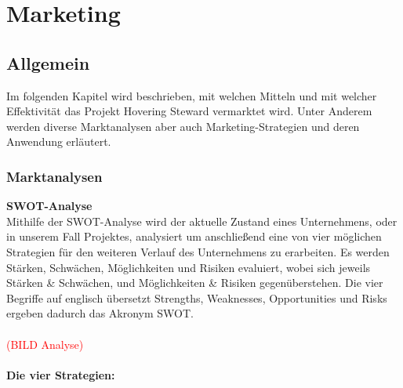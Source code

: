 \chapter{Marketing}
\renewcommand{\kapitelautor}{Autor: Markus Kaiser}

\section{Allgemein}
Im folgenden Kapitel wird beschrieben, mit welchen Mitteln und mit welcher Effektivität
das Projekt Hovering Steward vermarktet wird. Unter Anderem werden diverse Marktanalysen
aber auch Marketing-Strategien und deren Anwendung erläutert.

  \subsection{Marktanalysen}
  \textbf{SWOT-Analyse}\\
  Mithilfe der SWOT-Analyse wird der aktuelle Zustand eines Unternehmens, oder in unserem Fall Projektes, analysiert um anschließend eine von vier möglichen Strategien
  für den weiteren Verlauf des Unternehmens zu erarbeiten. Es werden Stärken, Schwächen, Möglichkeiten und Risiken evaluiert, wobei sich jeweils Stärken \& Schwächen, und
  Möglichkeiten \& Risiken gegenüberstehen. Die vier Begriffe auf englisch übersetzt Strengths, Weaknesses, Opportunities und Risks ergeben dadurch das Akronym SWOT.\\
  \\
  \textcolor{red}{(BILD Analyse)}\\
  \\
  \textbf{Die vier Strategien:}\\

